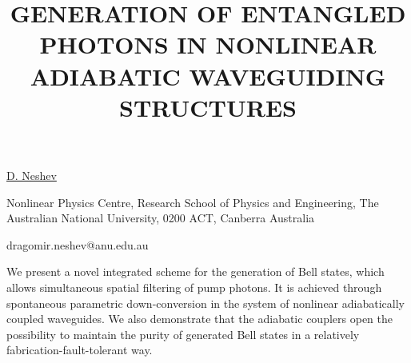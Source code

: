 \title{GENERATION OF ENTANGLED PHOTONS IN NONLINEAR ADIABATIC WAVEGUIDING STRUCTURES}

\underline{D. Neshev} 

{\normalsize{\vspace{-4mm}
Nonlinear Physics Centre,
Research School of Physics and Engineering,
The Australian National University,
0200 ACT, Canberra
Australia

\email dragomir.neshev@anu.edu.au}}

We present a novel integrated scheme for the generation of Bell states, which allows simultaneous spatial filtering of pump photons. It is achieved through spontaneous parametric down-conversion in the system of nonlinear adiabatically coupled waveguides. We also demonstrate that the adiabatic couplers open the possibility to maintain the purity of generated Bell states in a relatively fabrication-fault-tolerant way.

\vspace{\baselineskip}
